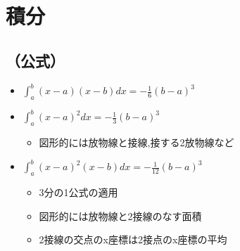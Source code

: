 \documentclass[dvipdfmx,uplatex]{jsarticle}
\begin{document}
\section{積分}
\subsection{（公式）}
\begin{itemize}
	\item $ \int^b_a (x - a)(x - b)dx = - \frac{1}{6} (b - a)^3$
	\item $\int^b_a (x - a)^2dx = - \frac{1}{3} (b - a)^3$
	\begin{itemize}
		\item 図形的には放物線と接線,接する2放物線など
	\end{itemize}
	\item $\int^b_a (x - a)^2(x - b)dx = - \frac{1}{12} (b - a)^3$
	\begin{itemize}
		\item 3分の1公式の適用
		\item 図形的には放物線と2接線のなす面積
		\item 2接線の交点のx座標は2接点のx座標の平均
	\end{itemize}
\end{itemize}
\end{document}
